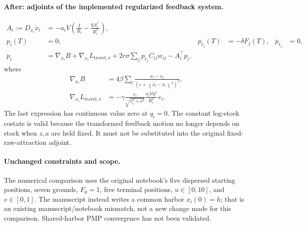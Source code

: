 \documentclass[11pt]{article}
\newcommand{\norm}[1]{\left\lVert #1\right\rVert}
\begin{document}
\paragraph{After: adjoints of the implemented regularized feedback system.}
\begin{align}
A_i:=D_{x_i}\dot x_i
 &=-a_iV\left(\frac{I}{R_i}-\frac{q_iq_i^\top}{R_i^3}\right),\\
p_i(T)&=0,&
p_{\ell_j}(T)&=-\delta F_j(T),&
\dot p_{\ell_j}&=0,\\
\dot p_i
 &=\nabla_{x_i}B
 +\nabla_{x_i}L_{\mathrm{travel},\nu}
 +2r\sigma\sum_jp_{\ell_j}C_{ij}w_{ij}
 -A_i^\top p_i ,
\end{align}
where
\begin{align}
\nabla_{x_i}B
 &=4\beta\sum_l
 \frac{x_l-x_i}{(\varepsilon+\norm{x_l-x_i}^2)^2},\\
\nabla_{x_i}L_{\mathrm{travel},\nu}
 &=-\gamma\frac{v_i}{\sqrt{v_i^2+\nu^2}}
   \frac{a_iV\eta^2}{R_i^3}\,e_i .
\end{align}
The last expression has continuous value zero at \(q_i=0\).
The constant log-stock costate is valid because the transformed feedback
motion no longer depends on stock when \(z,a\) are held fixed.
It must not be substituted into the original fixed-raw-attraction adjoint.

\paragraph{Unchanged constraints and scope.}
The numerical comparison uses the original notebook's five dispersed starting
positions, seven grounds, \(F_0=1\), free terminal positions, \(u\in[0,10]\),
and \(v\in[0,1]\). The manuscript instead writes a common harbor \(x_i(0)=h\);
that is an existing manuscript/notebook mismatch, not a new change made for
this comparison. Shared-harbor PMP convergence has not been validated.
\end{document}
